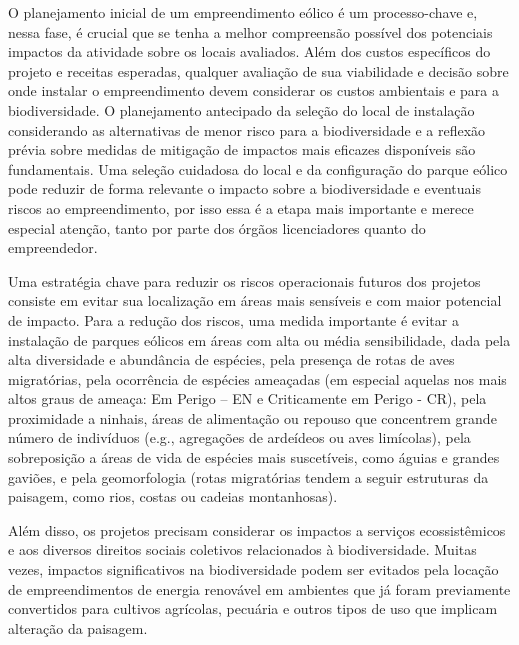 \documentclass[
  oneside]{scrbook}
\begin{document}
O planejamento inicial de um empreendimento eólico é um processo-chave e, nessa fase, é crucial que se tenha a melhor compreensão possível dos potenciais impactos da atividade sobre os locais avaliados. Além dos custos específicos do projeto e receitas esperadas, qualquer avaliação de sua viabilidade e decisão sobre onde instalar o empreendimento devem considerar os custos ambientais e para a biodiversidade. O planejamento antecipado da seleção do local de instalação considerando as alternativas de menor risco para a biodiversidade e a reflexão prévia sobre medidas de mitigação de impactos mais eficazes disponíveis são fundamentais. Uma seleção cuidadosa do local e da configuração do parque eólico pode reduzir de forma relevante o impacto sobre a biodiversidade e eventuais riscos ao empreendimento, por isso essa é a etapa mais importante e merece especial atenção, tanto por parte dos órgãos licenciadores quanto do empreendedor.

Uma estratégia chave para reduzir os riscos operacionais futuros dos projetos consiste em evitar sua localização em áreas mais sensíveis e com maior potencial de impacto. Para a redução dos riscos, uma medida importante é evitar a instalação de parques eólicos em áreas com alta ou média sensibilidade, dada pela alta diversidade e abundância de espécies, pela presença de rotas de aves migratórias, pela ocorrência de espécies ameaçadas (em especial aquelas nos mais altos graus de ameaça: Em Perigo -- EN e Criticamente em Perigo - CR), pela proximidade a ninhais, áreas de alimentação ou repouso que concentrem grande número de indivíduos (e.g., agregações de ardeídeos ou aves limícolas), pela sobreposição a áreas de vida de espécies mais suscetíveis, como águias e grandes gaviões, e pela geomorfologia (rotas migratórias tendem a seguir estruturas da paisagem, como rios, costas ou cadeias montanhosas).

Além disso, os projetos precisam considerar os impactos a serviços ecossistêmicos e aos diversos direitos sociais coletivos relacionados à biodiversidade. Muitas vezes, impactos significativos na biodiversidade podem ser evitados pela locação de empreendimentos de energia renovável em ambientes que já foram previamente convertidos para cultivos agrícolas, pecuária e outros tipos de uso que implicam alteração da paisagem.
\end{document}
